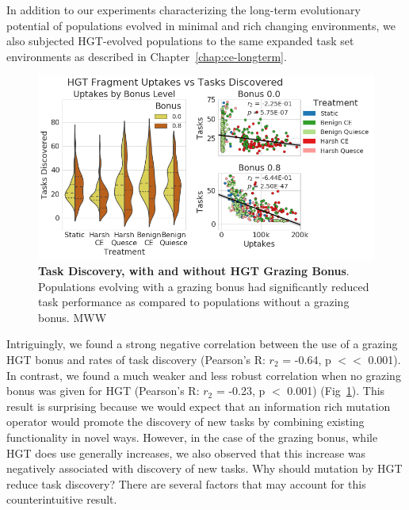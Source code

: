 \documentclass[PhD]{msu-thesis}
\begin{document}
In addition to our experiments characterizing the long-term evolutionary potential of populations evolved in minimal and rich changing environments, we also subjected HGT-evolved populations to the same expanded task set environments as described in Chapter~\ref{chap:ce-longterm}.
	\begin{figure}[!h]
	\includegraphics[trim={0 0 0 0}, clip, width=0.95\columnwidth]{figures/LTE/lte-hgt_bonus_vs_no_bonus_task_discovery.png}
	\caption{\textbf{Task Discovery, with and without HGT Grazing Bonus}. Populations evolving with a grazing bonus had significantly reduced task performance as compared to populations without a grazing bonus. MWW%
	}
	\label{fig:lte-hgt_bonus_vs_no_bonus_task_discovery}
	\end{figure}
Intriguingly, we found a strong negative correlation between the use of a grazing HGT bonus and rates of task discovery (Pearson's R: $r_{2}$ = -0.64, p $<<$ 0.001). 
In contrast, we found a much weaker and less robust correlation when no grazing bonus was given for HGT (Pearson's R: $r_{2}$ = -0.23, p $<$ 0.001) (Fig~\ref{fig:lte-hgt_bonus_vs_no_bonus_task_discovery}). This result is surprising because we would expect that an information rich mutation operator would promote the discovery of new tasks by combining existing functionality in novel ways. 
However, in the case of the grazing bonus, while HGT does use generally increases, we also observed that this increase was negatively associated with discovery of new tasks. Why should mutation by HGT reduce task discovery? There are several factors that may account for this counterintuitive result. 
\end{document}
